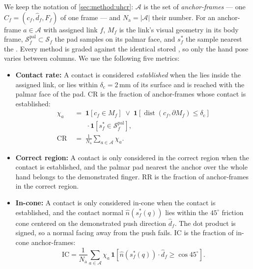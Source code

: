  We keep the notation of \cref{sec:method:uhcr}: $\mathcal{A}$ is the set of \emph{anchor-frames} --- one \fca $C_f = (c_f, \hat{d}_f, F_f)$ of one frame --- and $N_{\mathrm{a}} = |\mathcal{A}|$ their number. For an anchor-frame $a \in \mathcal{A}$ with assigned link $f$, $M_f$ is the link's visual geometry in its body frame, $\mathcal{S}^{\mathrm{pal}}_f \subset \mathcal{S}_f$ the pad samples on its palmar face, and $s^{*}_f$ the sample nearest the \fca. Every method is graded against the identical stored \fcas, so only the hand pose varies between columns. We use the following five metrics:
\begin{itemize}
    \item \textbf{Contact rate:} A contact is considered \emph{established} when the \fca lies inside the assigned link, or lies within $\delta_{\mathrm{c}} = 2$\,mm of its surface and is reached with the palmar face of the pad. CR is the fraction of anchor-frames whose contact is established:
    \begin{equation}
    \begin{aligned}
    \chi_a &\;=\; \mathbf{1}\!\left[c_f\in M_f\right] \;\vee\; \mathbf{1}\!\left[\operatorname{dist}\!\left(c_f,\partial M_f\right)\le\delta_{\mathrm{c}}\right] \\
    &\qquad\cdot\mathbf{1}\!\left[s^{*}_f \in \mathcal{S}^{\mathrm{pal}}_f\right],\\
    \mathrm{CR} &\;=\; \frac{1}{N_{\mathrm{a}}}\sum_{a\in\mathcal{A}}\chi_a.
    \end{aligned}
    \label{eq:established}
    \end{equation}
    \item \textbf{Correct region:} A contact is only considered in the correct region when the contact is established, and the palmar pad nearest the anchor over the whole hand belongs to the demonstrated finger. RR is the fraction of anchor-frames in the correct region.
    \item \textbf{In-cone:} A contact is only considered in-cone when the contact is established, and the contact normal $\hat{n}(s^{*}_f(q))$ lies within the $45^\circ$ friction cone centered on the demonstrated push direction $\hat{d}_f$. The dot product is signed, so a normal facing away from the push fails. IC is the fraction of in-cone anchor-frames:
    \begin{equation}
    \mathrm{IC}=\frac{1}{N_{\mathrm{a}}}\sum_{a\in\mathcal{A}}\chi_a\,\mathbf{1}\!\left[\hat{n}(s^{*}_f(q))\cdot\hat{d}_f\ge\cos 45^\circ\right].

\end{equation}
\end{itemize}
